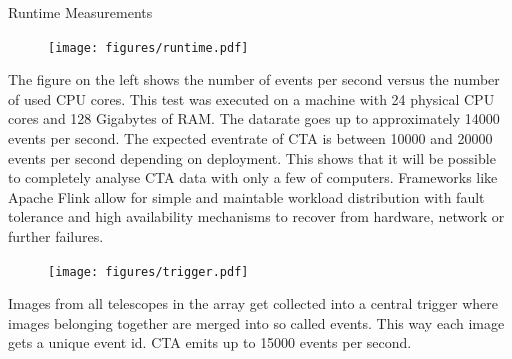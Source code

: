\begin{multicols}{2}
    \begin{block}[]{Runtime Measurements}%
      \begin{multicols}{2}
        \begin{figure}
          \texttt{[image: figures/runtime.pdf]}\\
        \end{figure}
        \columnbreak
          The figure on the left shows the number of events per second versus the number of used CPU cores.
          This test was executed on a machine with 24 physical CPU cores and 128 Gigabytes of RAM.
          The datarate goes up to approximately \num{14000} events per second. The expected eventrate of CTA is between
          \num{10000} and \num{20000} events per second depending on deployment\cite{trigger}.
          This shows that it will be possible to completely analyse CTA data with only a few of computers.
          Frameworks like Apache Flink allow for simple and maintable workload distribution with fault tolerance and high availability mechanisms to recover from hardware, network or further failures.
      \end{multicols}
    \end{block}%


    \columnbreak

        \begin{center}

        \begin{streamblock}[equal height group=C, width=0.8\linewidth]{0mm}{-5mm}{}%
          \begin{multicols}{2}
            \begin{figure}
              \texttt{[image: figures/trigger.pdf]}
            \end{figure}
            \columnbreak
            Images from all telescopes in the array get collected into a central trigger where images belonging together are merged into so called events.
            This way each image gets a unique event id.
            CTA emits up to \num{15 000} events per second\cite{trigger}.
          \end{multicols}
        \end{streamblock}%


\end{center}
\end{multicols}
